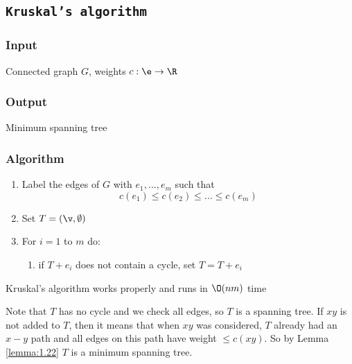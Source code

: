 \subsection{\texttt{Kruskal's algorithm}}
\subsubsection{Input}
Connected graph $G$, weights $c: \e \rightarrow \R$
\subsubsection{Output}
Minimum spanning tree
\subsubsection{Algorithm}
\begin{enumerate}
    \item Label the edges of $G$ with $e_1, \dots, e_m$ such that
    \begin{equation*}
        c(e_1) \leq c(e_2) \leq \dots \leq c(e_m)
    \end{equation*}
    \item Set $T = (\v, \emptyset)$
    \item For $i = 1$ to $m$ do:
    \begin{enumerate}
        \item if $T + e_i$ does not contain a cycle, set $T = T + e_i$
    \end{enumerate}
\end{enumerate}
\begin{customtheorem}{1.23}
    \label{theorem:1.23}
    Kruskal's algorithm works properly and runs in $\O(nm)$ time
\end{customtheorem}
\begin{prf}
    Note that $T$ has no cycle and we check all edges, so $T$ is a spanning tree. If $xy$ is not added to $T$, then it means that when $xy$ was considered, $T$ already had an $x - y$ path and all edges on this path have weight $\leq c(xy)$. So by Lemma \ref{lemma:1.22} $T$ is a minimum spanning tree.
\end{prf}